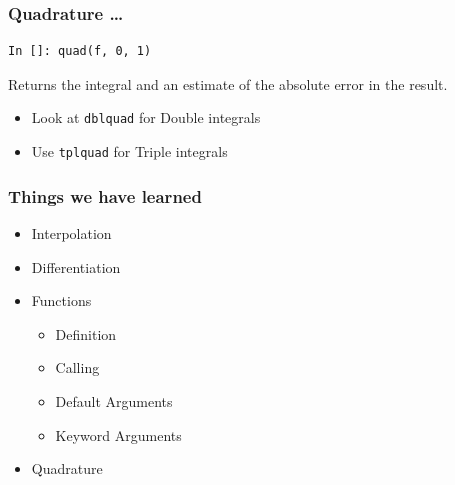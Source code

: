 \documentclass[14pt,compress]{beamer}
\newcommand{\typ}[1]{\lstinline{#1}}
\begin{document}
\begin{frame}[fragile]
\frametitle{Quadrature \ldots}
\begin{lstlisting}
In []: quad(f, 0, 1)
\end{lstlisting}
Returns the integral and an estimate of the absolute error in the result.
\begin{itemize}
\item Look at \typ{dblquad} for Double integrals
\item Use \typ{tplquad} for Triple integrals
\end{itemize}
\end{frame}

\begin{frame}
  \frametitle{Things we have learned}
  \begin{itemize}
  \item Interpolation
  \item Differentiation
  \item Functions
    \begin{itemize}
    \item Definition
    \item Calling
    \item Default Arguments
    \item Keyword Arguments
    \end{itemize}
  \item Quadrature
  \end{itemize}
\end{frame}
\end{document}
